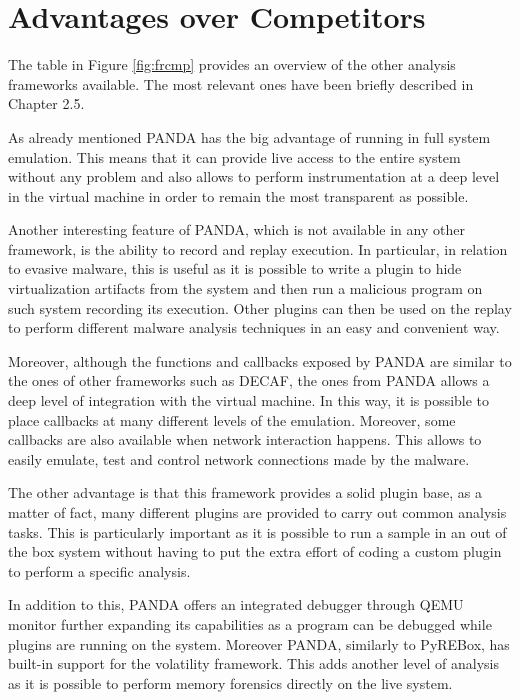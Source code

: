 \section{Advantages over Competitors}

The table in Figure \ref{fig:frcmp} provides an overview of the other analysis frameworks available. The most relevant ones have been briefly described in Chapter 2.5. 

As already mentioned PANDA has the big advantage of running in full system emulation. This means that it can provide live access to the entire system without any problem and also allows to perform instrumentation at a deep level in the virtual machine in order to remain the most transparent as possible. 

Another interesting feature of PANDA, which is not available in any other framework, is the ability to record and replay execution. In particular, in relation to evasive malware, this is useful as it is possible to write a plugin to hide virtualization artifacts from the system and then run a malicious program on such system recording its execution. Other plugins can then be used on the replay to perform different malware analysis techniques in an easy and convenient way.

Moreover, although the functions and callbacks exposed by PANDA are similar to the ones of other frameworks such as DECAF, the ones from PANDA allows a deep level of integration with the virtual machine. In this way, it is possible to place callbacks at many different levels of the emulation. Moreover, some callbacks are also available when network interaction happens. This allows to easily emulate, test and control network connections made by the malware. 

The other advantage is that this framework provides a solid plugin base, as a matter of fact, many different plugins are provided to carry out common analysis tasks. This is particularly important as it is possible to run a sample in an out of the box system without having to put the extra effort of coding a custom plugin to perform a specific analysis. 

In addition to this, PANDA offers an integrated debugger through QEMU monitor further expanding its capabilities as a program can be debugged while plugins are running on the system. Moreover PANDA, similarly to PyREBox, has built-in support for the volatility framework. This adds another level of analysis as it is possible to perform memory forensics directly on the live system.